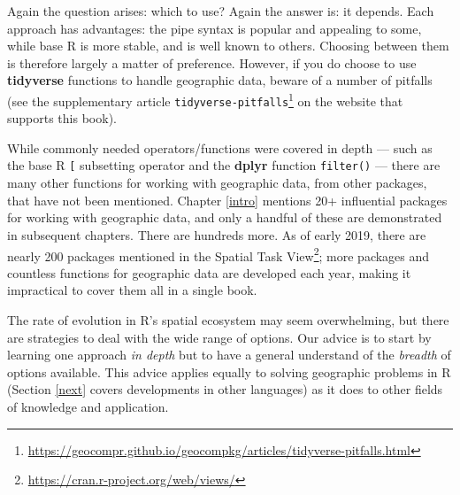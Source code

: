 \documentclass[]{krantz}
\newenvironment{Shaded}{\begin{snugshade}}{\end{snugshade}}
\newcommand{\CommentTok}[1]{\textcolor[rgb]{0.37,0.37,0.37}{\textit{#1}}}
\newcommand{\KeywordTok}[1]{\textcolor[rgb]{0.27,0.27,0.27}{\textbf{#1}}}
\newcommand{\NormalTok}[1]{#1}
\newcommand{\OperatorTok}[1]{\textcolor[rgb]{0.43,0.43,0.43}{\textbf{#1}}}
\newcommand{\StringTok}[1]{\textcolor[rgb]{0.5,0.5,0.5}{#1}}
\let\rmarkdownfootnote\footnote%
\def\footnote{\protect\rmarkdownfootnote}
\renewcommand{\href}[2]{#2\footnote{\url{#1}}}
\begin{document}
\begin{Shaded}
\end{Shaded}

Again the question arises: which to use?
Again the answer is: it depends.
Each approach has advantages: the pipe syntax is popular and appealing to some, while base R is more stable, and is well known to others.
Choosing between them is therefore largely a matter of preference.
However, if you do choose to use \textbf{tidyverse} functions to handle geographic data, beware of a number of pitfalls (see the supplementary article \href{https://geocompr.github.io/geocompkg/articles/tidyverse-pitfalls.html}{\texttt{tidyverse-pitfalls}} on the website that supports this book).

While commonly needed operators/functions were covered in depth --- such as the base R \texttt{{[}} subsetting operator and the \textbf{dplyr} function \texttt{filter()} --- there are many other functions for working with geographic data, from other packages, that have not been mentioned.
Chapter \ref{intro} mentions 20+ influential packages for working with geographic data, and only a handful of these are demonstrated in subsequent chapters.
There are hundreds more.
As of early 2019, there are nearly 200 packages mentioned in the Spatial \href{https://cran.r-project.org/web/views/}{Task View};
more packages and countless functions for geographic data are developed each year, making it impractical to cover them all in a single book.

The rate of evolution in R's spatial ecosystem may seem overwhelming, but there are strategies to deal with the wide range of options.
Our advice is to start by learning one approach \emph{in depth} but to have a general understand of the \emph{breadth} of options available.
This advice applies equally to solving geographic problems in R (Section \ref{next} covers developments in other languages) as it does to other fields of knowledge and application.
\end{document}
